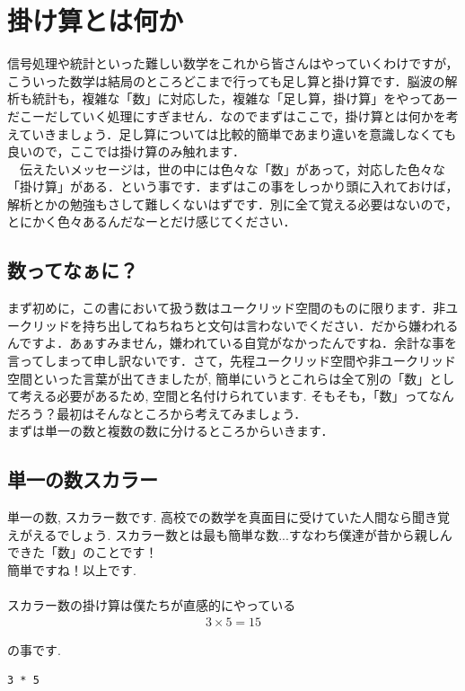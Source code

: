 \documentclass[11pt,a4paper]{jreport}
\begin{document}
\section{掛け算とは何か}
信号処理や統計といった難しい数学をこれから皆さんはやっていくわけですが，こういった数学は結局のところどこまで行っても足し算と掛け算です．脳波の解析も統計も，複雑な「数」に対応した，複雑な「足し算，掛け算」をやってあーだこーだしていく処理にすぎません．なのでまずはここで，掛け算とは何かを考えていきましょう．足し算については比較的簡単であまり違いを意識しなくても良いので，ここでは掛け算のみ触れます．\\
　伝えたいメッセージは，世の中には色々な「数」があって，対応した色々な「掛け算」がある．という事です．まずはこの事をしっかり頭に入れておけば，解析とかの勉強もさして難しくないはずです．別に全て覚える必要はないので，とにかく色々あるんだなーとだけ感じてください．
\subsection{数ってなぁに？}
まず初めに，この書において扱う数はユークリッド空間のものに限ります．非ユークリッドを持ち出してねちねちと文句は言わないでください．だから嫌われるんですよ．あぁすみません，嫌われている自覚がなかったんですね．余計な事を言ってしまって申し訳ないです．さて，先程ユークリッド空間や非ユークリッド空間といった言葉が出てきましたが, 簡単にいうとこれらは全て別の「数」として考える必要があるため, 空間と名付けられています. そもそも，「数」ってなんだろう？最初はそんなところから考えてみましょう．\\
まずは単一の数と複数の数に分けるところからいきます．\\

\subsection{単一の数スカラー}
単一の数, スカラー数です. 高校での数学を真面目に受けていた人間なら聞き覚えがえるでしょう. スカラー数とは最も簡単な数...すなわち僕達が昔から親しんできた「数」のことです！\\
簡単ですね！以上です.\\
\\
スカラー数の掛け算は僕たちが直感的にやっている
\begin{eqnarray}
\label{eq:kakezan}
3 × 5 = 15
\end{eqnarray}

の事です.
\begin{lstlisting}[caption=式(\ref{eq:kakezan})のMATLABコード,label=sc:kakezan]
3 * 5
\end{lstlisting}
\end{document}

